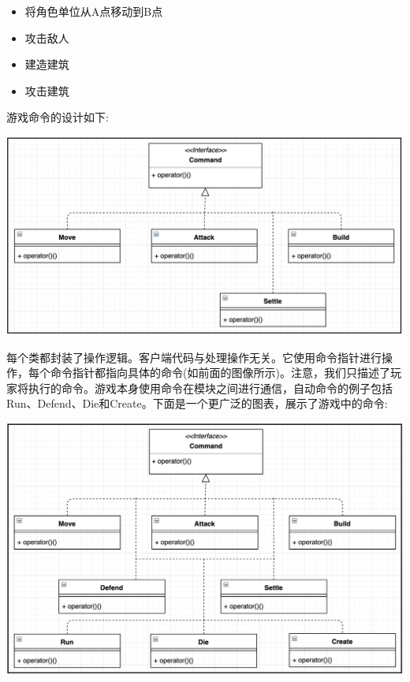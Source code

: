 \begin{itemize}
	\item 将角色单位从A点移动到B点
	\item 攻击敌人
	\item 建造建筑
	\item 攻击建筑
\end{itemize}

游戏命令的设计如下: \par

\begin{center}
	\includegraphics[width=1.0\textwidth]{content/Section-2/Chapter-11/6}
\end{center}

每个类都封装了操作逻辑。客户端代码与处理操作无关。它使用命令指针进行操作，每个命令指针都指向具体的命令(如前面的图像所示)。注意，我们只描述了玩家将执行的命令。游戏本身使用命令在模块之间进行通信，自动命令的例子包括Run、Defend、Die和Create。下面是一个更广泛的图表，展示了游戏中的命令: \par

\begin{center}
	\includegraphics[width=1.0\textwidth]{content/Section-2/Chapter-11/7}
\end{center}

